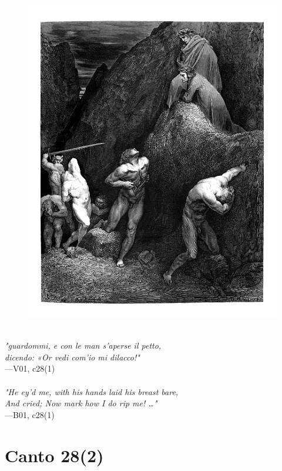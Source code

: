 \documentclass[../Dore_vision.tex]{subfiles}
\begin{document}
\begin{figure}[ht]
\centering
\includegraphics[height=\figsize]{illustrations/book_1/V01, c28(1).jpg}
\end{figure}

\begin{center}
\begin{minipage}{0.8\linewidth}
\textit{\\
"guardommi, e con le man s’aperse il petto,\\dicendo: «Or vedi com’io mi dilacco!"} \\
—V01, c28(1) \\~\\
\textit{"He ey'd me, with his hands laid his breast bare,\\And cried; \textquotesingle Now mark how I do rip me! …"} \\
—B01, c28(1)
\end{minipage}
\end{center}

\newpage

\section{Canto 28(2)}
\end{document}
